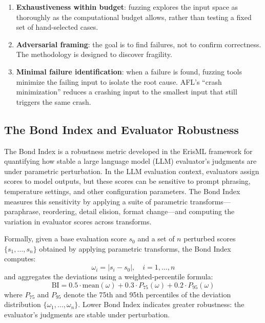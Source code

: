 \documentclass[12pt]{article}
\begin{document}
\begin{enumerate}
    \item \textbf{Exhaustiveness within budget}: fuzzing explores the input space as thoroughly as the computational budget allows, rather than testing a fixed set of hand-selected cases.
    \item \textbf{Adversarial framing}: the goal is to find failures, not to confirm correctness.  The methodology is designed to discover fragility.
    \item \textbf{Minimal failure identification}: when a failure is found, fuzzing tools minimize the failing input to isolate the root cause.  AFL's ``crash minimization'' reduces a crashing input to the smallest input that still triggers the same crash.
\end{enumerate}

\subsection{The Bond Index and Evaluator Robustness}

The Bond Index \cite{bond2026geometric} is a robustness metric developed in the ErisML framework for quantifying how stable a large language model (LLM) evaluator's judgments are under parametric perturbation.  In the LLM evaluation context, evaluators assign scores to model outputs, but these scores can be sensitive to prompt phrasing, temperature settings, and other configuration parameters.  The Bond Index measures this sensitivity by applying a suite of parametric transforms---paraphrase, reordering, detail elision, format change---and computing the variation in evaluator scores across transforms.

Formally, given a base evaluation score $s_0$ and a set of $n$ perturbed scores $\{s_1, \ldots, s_n\}$ obtained by applying parametric transforms, the Bond Index computes:
\begin{equation}
    \omega_i = |s_i - s_0|, \quad i = 1, \ldots, n
\end{equation}
and aggregates the deviations using a weighted-percentile formula:
\begin{equation}
    \mathrm{BI} = 0.5 \cdot \mathrm{mean}(\omega) + 0.3 \cdot P_{75}(\omega) + 0.2 \cdot P_{95}(\omega)
    \label{eq:bond_index}
\end{equation}
where $P_{75}$ and $P_{95}$ denote the 75th and 95th percentiles of the deviation distribution $\{\omega_1, \ldots, \omega_n\}$.  Lower Bond Index indicates greater robustness: the evaluator's judgments are stable under perturbation.
\end{document}
